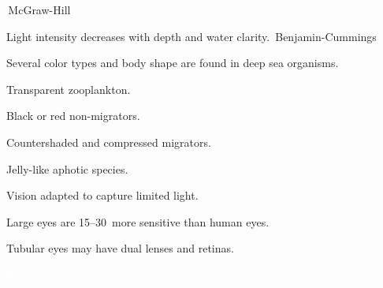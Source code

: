 \documentclass[t,handout]{beamer}  %
\begin{document}
{
\begin{frame}[b]
\tiny\textcopyright\,McGraw-Hill
\end{frame}}

{
\begin{frame}[b]{Light intensity decreases with depth and water clarity.}
\tiny\textcopyright\,Benjamin-Cummings
\end{frame}}

{
\begin{frame}[t]{Several color types and body shape are found in deep sea organisms.}

\vspace*{-\baselineskip}

\hangpara Transparent zooplankton.

\hangpara Black or red non-migrators.

\hangpara\parbox{0.45\textwidth}{Countershaded and compressed migrators.}

\hangpara Jelly-like aphotic species.

\end{frame}}


{
\begin{frame}[t]{Vision adapted to capture limited light.}

	\hangpara\parbox{0.48\textwidth}{Large eyes are 15–30\times\ more sensitive than human eyes.}

	\hangpara\parbox{0.48\textwidth}{Tubular eyes may have dual lenses and retinas.}

\end{frame}}

{
\begin{frame}[t]{\textcolor{white}{Bioluminescence is chemical light produced by living organisms.}}

\end{frame}}

{
\begin{frame}[c]

	\begin{center}
	\end{center}
	
\end{frame}}
\end{document}

